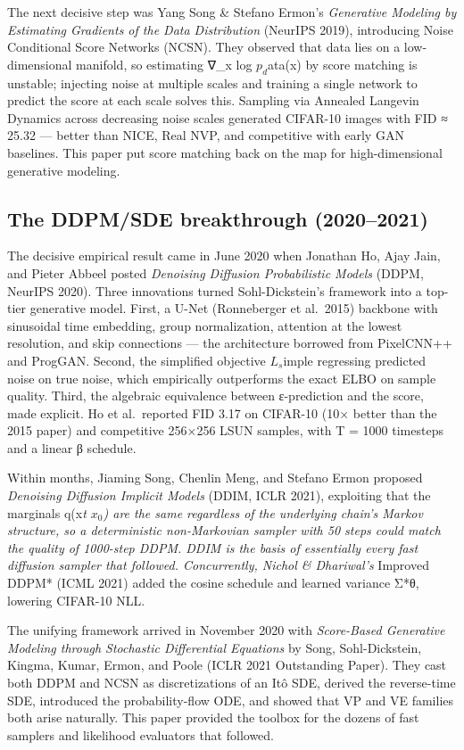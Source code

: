 \documentclass{article}
\begin{document}
The next decisive step was Yang Song \& Stefano Ermon's \emph{Generative Modeling by Estimating Gradients of the Data Distribution} (NeurIPS 2019), introducing Noise Conditional Score Networks (NCSN). They observed that data lies on a low-dimensional manifold, so estimating ∇\_x log \(p_d\)ata(x) by score matching is unstable; injecting noise at multiple scales and training a single network to predict the score at each scale solves this. Sampling via Annealed Langevin Dynamics across decreasing noise scales generated CIFAR-10 images with FID ≈ 25.32 --- better than NICE, Real NVP, and competitive with early GAN baselines. This paper put score matching back on the map for high-dimensional generative modeling.

\subsection{The DDPM/SDE breakthrough (2020--2021)}\label{the-ddpmsde-breakthrough-20202021}

The decisive empirical result came in June 2020 when Jonathan Ho, Ajay Jain, and Pieter Abbeel posted \emph{Denoising Diffusion Probabilistic Models} (DDPM, NeurIPS 2020). Three innovations turned Sohl-Dickstein's framework into a top-tier generative model. First, a U-Net (Ronneberger et al.~2015) backbone with sinusoidal time embedding, group normalization, attention at the lowest resolution, and skip connections --- the architecture borrowed from PixelCNN++ and ProgGAN. Second, the simplified objective \(L_s\)imple regressing predicted noise on true noise, which empirically outperforms the exact ELBO on sample quality. Third, the algebraic equivalence between ε-prediction and the score, made explicit. Ho et al.~reported FID 3.17 on CIFAR-10 (10× better than the 2015 paper) and competitive 256×256 LSUN samples, with T = 1000 timesteps and a linear β schedule.

Within months, Jiaming Song, Chenlin Meng, and Stefano Ermon proposed \emph{Denoising Diffusion Implicit Models} (DDIM, ICLR 2021), exploiting that the marginals q(x\emph{t \textbar{} \(x_0\)) are the same regardless of the underlying chain's Markov structure, so a deterministic non-Markovian sampler with 50 steps could match the quality of 1000-step DDPM. DDIM is the basis of essentially every fast diffusion sampler that followed. Concurrently, Nichol \& Dhariwal's }Improved DDPM* (ICML 2021) added the cosine schedule and learned variance Σ*θ, lowering CIFAR-10 NLL.

The unifying framework arrived in November 2020 with \emph{Score-Based Generative Modeling through Stochastic Differential Equations} by Song, Sohl-Dickstein, Kingma, Kumar, Ermon, and Poole (ICLR 2021 Outstanding Paper). They cast both DDPM and NCSN as discretizations of an Itô SDE, derived the reverse-time SDE, introduced the probability-flow ODE, and showed that VP and VE families both arise naturally. This paper provided the toolbox for the dozens of fast samplers and likelihood evaluators that followed.
\end{document}
